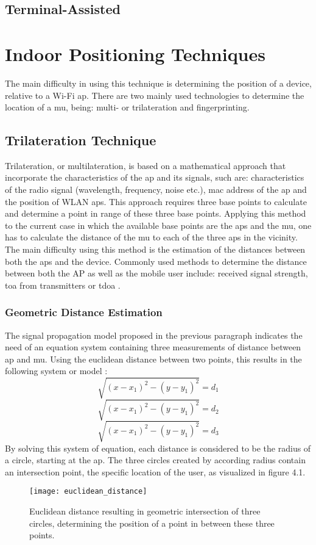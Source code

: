 \subsection{Terminal-Assisted}
\section{Indoor Positioning Techniques}
The main difficulty in using this technique is determining the position of a device, relative to a Wi-Fi \acrfull{ap}. There are two mainly used technologies to determine the location of a \acrfull{mu}, being: multi- or trilateration and fingerprinting.
\subsection{Trilateration Technique}
Trilateration, or multilateration, is based on a mathematical approach that incorporate the characteristics of the \acrshort{ap} and its signals, such are: characteristics of the radio signal (wavelength, frequency, noise etc.), \acrfull{mac} address of the \acrlong{ap} and the position of WLAN \acrshort{ap}s. This approach requires three base points to calculate and determine a point in range of these three base points. Applying this method to the current case in which the available base points are the \acrshort{ap}s and the \acrshort{mu}, one has to calculate the distance of the \acrlong{mu} to each of the three \acrshort{ap}s in the vicinity. The main difficulty using this method is the estimation of the distances between both the \acrshort{ap}s and the device. Commonly used methods to determine the distance between both the AP as well as the mobile user include: received signal strength, \acrfull{toa} from transmitters or \acrfull{tdoa} \cite[p.~1]{Shchekotov}.
\subsubsection{Geometric Distance Estimation}
The signal propagation model proposed in the previous paragraph indicates the need of an equation system containing three measurements of distance between \acrshort{ap} and \acrlong{mu}. Using the euclidean distance between two points, this results in the following system or model \cite{CutTheKnot}:
\[ \sqrt{(x-x_1)^2 - (y-y_1)^2} = d_1 \]
\[ \sqrt{(x-x_1)^2 - (y-y_1)^2} = d_2 \]
\[ \sqrt{(x-x_1)^2 - (y-y_1)^2} = d_3 \]
By solving this system of equation, each distance is considered to be the radius of a circle, starting at the \acrshort{ap}. The three circles created by according radius contain an intersection point, the specific location of the user, as visualized in figure 4.1.
\begin{figure}[h!]
\centering
\texttt{[image: euclidean\_distance]}
\caption{Euclidean distance resulting in geometric intersection of three circles, determining the position of a point in between these three points.}
\label{fig:euclidean}
\end{figure}
